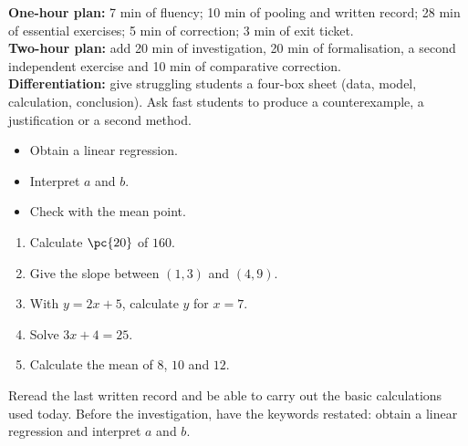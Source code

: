 \ifmxteacher
\begin{method}
\textbf{One-hour plan:} 7 min of fluency; 10 min of pooling and written record; 28 min of essential exercises; 5 min of correction; 3 min of exit ticket.\\
\textbf{Two-hour plan:} add 20 min of investigation, 20 min of formalisation, a second independent exercise and 10 min of comparative correction.\\
\textbf{Differentiation:} give struggling students a four-box sheet (data, model, calculation, conclusion). Ask fast students to produce a counterexample, a justification or a second method.
\end{method}
\fi
{}
\begin{objectives}\begin{itemize}\item Obtain a linear regression.\item Interpret $a$ and $b$.\item Check with the mean point.\end{itemize}\end{objectives}
\begin{fluency}\begin{enumerate}\item Calculate $\pc{20}$ of $160$. \item Give the slope between $(1,3)$ and $(4,9)$. \item With $y=2x+5$, calculate $y$ for $x=7$. \item Solve $3x+4=25$. \item Calculate the mean of $8$, $10$ and $12$. \end{enumerate}\end{fluency}
\begin{prerequisites}Reread the last written record and be able to carry out the basic calculations used today. Before the investigation, have the keywords restated: obtain a linear regression and interpret $a$ and $b$.\end{prerequisites}


